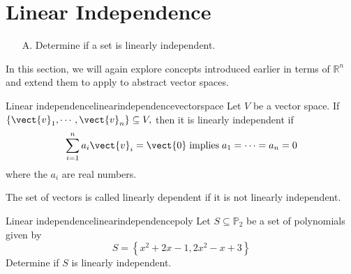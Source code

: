 \section{Linear Independence}

\begin{outcome}
\begin{enumerate}
\item[A.] Determine if a set is linearly independent.
\end{enumerate}
\end{outcome}

In this section, we will again explore concepts introduced earlier in terms of $\mathbb{R}^n$ and extend them to apply to abstract vector spaces. 

\begin{definition}{Linear independence}{linearindependencevectorspace}
Let $V$ be a vector space. If $\{\vect{v}_{1},\cdots ,\vect{v}_{n}\} \subseteq V,$ then it is linearly independent
 if
\begin{equation*}
\sum_{i=1}^{n}a_{i}\vect{v}_{i}=\vect{0} \;\mbox{implies}\;
a_{1}=\cdots =a_{n}=0
\end{equation*}
where the $a_i$ are real numbers. 
\end{definition}

The
set of vectors is called linearly dependent if it is not linearly independent.

\begin{example}{Linear independence}{linearindependencepoly}
Let $S \subseteq \mathbb{P}_2$ be a set of polynomials given by
\[
S = \left\{ x^2 + 2x - 1, 2x^2 - x + 3 \right\}
\]
Determine if $S$ is linearly independent. 
\end{example}

